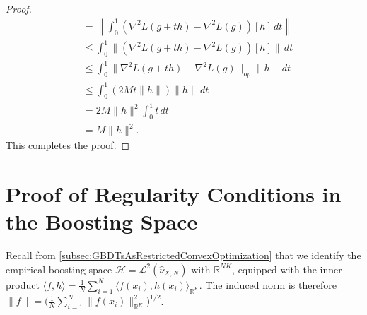 \documentclass{article}
\theoremstyle{plain}
\theoremstyle{definition}
\theoremstyle{remark}
\begin{document}
\begin{proof}
\begin{align*}
    &= \left\| \int_0^1 (\nabla^2 L(g+th) - \nabla^2 L(g))[h] \,dt \right\| \\
    &\leq \int_0^1 \| (\nabla^2 L(g+th) - \nabla^2 L(g))[h] \| \,dt \\
    &\leq \int_0^1 \| \nabla^2 L(g+th) - \nabla^2 L(g) \|_{op} \|h\| \,dt \\
    &\leq \int_0^1 (2M t \|h\|) \|h\| \,dt \\
    &= 2M \|h\|^2 \int_0^1 t \,dt \\
    &= M \|h\|^2.
\end{align*}
This completes the proof.
\end{proof}








\clearpage
\section{Proof of Regularity Conditions in the Boosting Space}
\label{app:RegularityAssumptionsCarryOverProof}

Recall from \cref{subsec:GBDTsAsRestrictedConvexOptimization} that we identify the empirical boosting space $\mathcal{H} = \mathcal{L}^2(\widehat{\nu}_{X,N})$ with $\mathbb{R}^{NK}$, equipped with the inner product $\langle f, h\rangle = \frac{1}{N}\sum_{i=1}^N \langle f(x_i),h(x_i) \rangle_{\mathbb{R}^K}$. The induced norm is therefore $\|f\| = \big(\frac{1}{N}\sum_{i=1}^N \|f(x_i)\|^2_{\mathbb{R}^K}\big)^{1/2}$.
\end{document}
